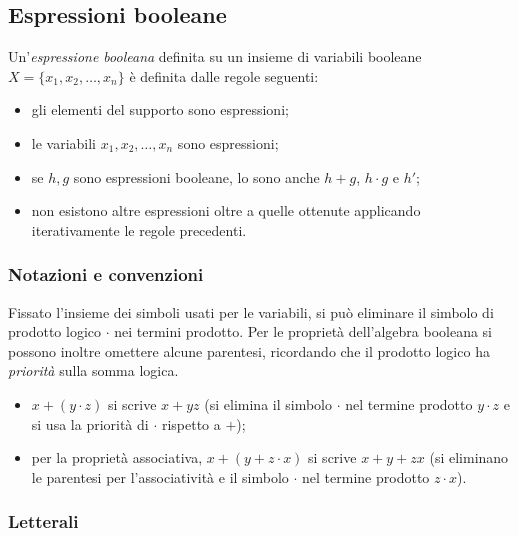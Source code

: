 \documentclass[11pt,a4paper]{article}
\begin{document}
\subsection{Espressioni booleane}

\begin{definizione}
Un'\emph{espressione booleana} definita su un insieme di variabili booleane
$X = \{x_1, x_2, \dots, x_n\}$ è definita dalle regole seguenti:
\begin{itemize}
    \item gli elementi del supporto sono espressioni;
    \item le variabili $x_1, x_2, \dots, x_n$ sono espressioni;
    \item se $h, g$ sono espressioni booleane, lo sono anche $h + g$,
          $h \cdot g$ e $h'$;
    \item non esistono altre espressioni oltre a quelle ottenute applicando
          iterativamente le regole precedenti.
\end{itemize}
\end{definizione}

\subsubsection{Notazioni e convenzioni}

Fissato l'insieme dei simboli usati per le variabili, si può eliminare il
simbolo di prodotto logico $\cdot$ nei termini prodotto. Per le proprietà
dell'algebra booleana si possono inoltre omettere alcune parentesi, ricordando
che il prodotto logico ha \emph{priorità} sulla somma logica.

\begin{esempio}
\begin{itemize}
    \item $x + (y \cdot z)$ si scrive $x + yz$ (si elimina il simbolo $\cdot$
          nel termine prodotto $y \cdot z$ e si usa la priorità di $\cdot$
          rispetto a $+$);
    \item per la proprietà associativa, $x + (y + z \cdot x)$ si scrive
          $x + y + zx$ (si eliminano le parentesi per l'associatività e il
          simbolo $\cdot$ nel termine prodotto $z \cdot x$).
\end{itemize}
\end{esempio}

\subsubsection{Letterali}
\end{document}
